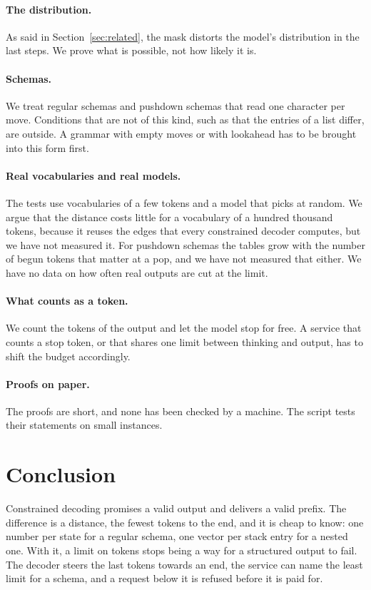 \documentclass[acmsmall,nonacm,screen]{acmart}
\begin{document}
\paragraph{The distribution.} As said in Section~\ref{sec:related}, the mask distorts the
model's distribution in the last steps. We prove what is possible, not how likely it is.

\paragraph{Schemas.} We treat regular schemas and pushdown schemas that read one character
per move. Conditions that are not of this kind, such as that the entries of a list differ,
are outside. A grammar with empty moves or with lookahead has to be brought into this form
first.

\paragraph{Real vocabularies and real models.} The tests use vocabularies of a few tokens
and a model that picks at random. We argue that the distance costs little for a vocabulary
of a hundred thousand tokens, because it reuses the edges that every constrained decoder
computes, but we have not measured it. For pushdown schemas the tables grow with the number
of begun tokens that matter at a pop, and we have not measured that either. We have no data
on how often real outputs are cut at the limit.

\paragraph{What counts as a token.} We count the tokens of the output and let the model
stop for free. A service that counts a stop token, or that shares one limit between thinking
and output, has to shift the budget accordingly.

\paragraph{Proofs on paper.} The proofs are short, and none has been checked by a machine.
The script tests their statements on small instances.

\section{Conclusion}

Constrained decoding promises a valid output and delivers a valid prefix. The difference is
a distance, the fewest tokens to the end, and it is cheap to know: one number per state for a
regular schema, one vector per stack entry for a nested one. With it, a limit on tokens stops
being a way for a structured output to fail. The decoder steers the last tokens towards an
end, the service can name the least limit for a schema, and a request below it is refused
before it is paid for.



\end{document}
